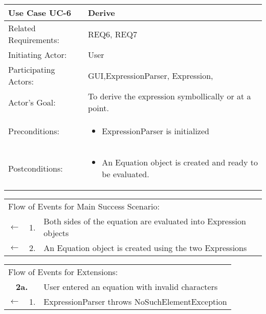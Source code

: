 \documentclass[11pt]{article}
\begin{document}
\newpage

\begin{center}
\begin{tabular}{p{1.5in}p{5in}}
\hline
\textbf{Use Case UC-6}     & \textbf{Derive} \\ \hline
Related Requirements: & REQ6, REQ7 \\
Initiating Actor:     & User \\
Participating Actors: & GUI,ExpressionParser, Expression, \\
Actor's Goal:          & To derive the expression symbollically or at a point. \\
Preconditions:         & \begin{itemize}[nosep]
		      \item  ExpressionParser is initialized
                         \end{itemize} \\
Postconditions:        & \begin{itemize}[nosep]
                         \item An Equation object is created and ready to be evaluated.
                         \end{itemize} \\ \hline
\end{tabular}

\begin{tabular}{p{.25in}p{.25in}p{5.8in}}
\multicolumn{3}{l}{Flow of Events for Main Success Scenario:} \\
$\leftarrow$  & 1. & Both sides of the equation are evaluated into Expression objects\\
$\leftarrow$  & 2. & An Equation object is created using the two Expressions\\
\end{tabular}

\begin{tabular}{p{.25in}p{.25in}p{5.8in}}
\multicolumn{3}{l}{Flow of Events for Extensions:} \\
\multicolumn{2}{c}{\textbf{2a.}} & User entered an equation with invalid characters \\
$\leftarrow$  & 1.           & ExpressionParser throws NoSuchElementException\\


\end{tabular}
\end{center}
\end{document}
